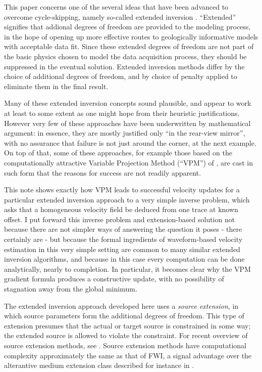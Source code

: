 This paper concerns one of the several ideas that have been advanced to
overcome cycle-skipping, namely so-called extended inversion
\cite[]{geoprosp:2008}. ``Extended'' signifies that addional degrees
of freedom are provided to the modeling process, in the hope of
opening up more effective routes to geologically informative models
with acceptable data fit. Since these extended degrees of freedom are
not part of the basic physics chosen to model the data acquisition
process, they should be suppressed in the eventual solution. Extended
inversion methods differ by the choice of additional degrees of
freedom, and by choice of penalty applied to eliminate them in the final
result.

Many of these extended inversion concepts sound plausible, and appear
to work at least to some extent as one might hope from their heuristic
justifications. However very few of these approaches have been
underwritten by mathematical argument: in essence, they are mostly
justified only ``in the rear-view mirror'', with no assurance that
failure is not just around the corner, at the next example. On top of
that, some of these approaches, for example those based on the
computationally attractive Variable Projection Method (``VPM'') of
\cite{GolubPereyra:03}, are cast in such form that the reasons for
success are not readily apparent.

This note shows exactly how VPM leads to successful velocity updates
for a particular extended inversion approach to a very simple inverse
problem, which asks that a homogeneous velocity field be deduced from
one trace at known offset. I put forward this inverse problem and
extension-based solution not because there are not simpler
ways of answering the question it poses - there certainly are - but
because the formal ingredients of waveform-based velocity estimation
in this very simple setting are common to many similar extended
inversion algorithms, and because in this case every computation can
be done analytically, nearly to completion. In particular, it becomes
clear why the VPM gradient formula produces a constructive update,
with no possibility of stagnation away from the global minimum.

The extended inversion approach
developed here uses a {\em source extension}, in which source
parameters form the additional degrees of freedom. This type of
extension presumes that the actual or target source is constrained in
some way; the extended source is allowed to violate the
constraint. For recent overview of source extension methods, see
\cite{HuangNammourSymesDollizal:SEG19}. Source
extension methods have computational complexity approximately the same
as that of FWI, a signal advantage over the alterantive medium
extension class described for instance in \cite[]{geoprosp:2008}.

